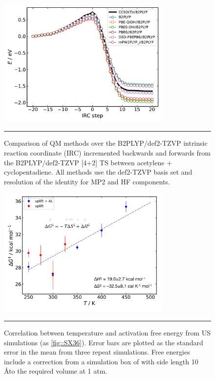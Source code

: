 \documentclass[11pt]{article}
\numberwithin{equation}{subsection}
\begin{document}
\begin{figure}[h!]
	\centering
	\vspace{0.4cm}
	\includegraphics[height=6.4cm]{figSX32.pdf}
	\vspace{0.1cm}
	\hrule
	\vspace{0.1cm}
	\caption{Comparison of QM methods over the B2PLYP/def2-TZVP intrinsic reaction coordinate (IRC) incremented backwards and forwards from the B2PLYP/def2-TZVP [4+2] TS between acetylene + cyclopentadiene. All methods use the def2-TZVP basis set and resolution of the identity for MP2 and HF components.}
	\label{fig::SX32}
\end{figure}



\begin{figure}[h!]
	\centering
	\vspace{0.4cm}
	\includegraphics[height=6.4cm]{figSX37.pdf}
	\vspace{0.1cm}
	\hrule
	\vspace{0.1cm}
	\caption{Correlation between temperature and activation free energy from US simulations (as \figurename{ \ref{fig::SX36}}). Error bars are plotted as the standard error in the mean from three repeat simulations. Free energies include a correction from a simulation box of with side length 10 \AA to the required volume at 1 atm.\cite{General2010}}
	\label{fig::SX37}
\end{figure}
\end{document}
